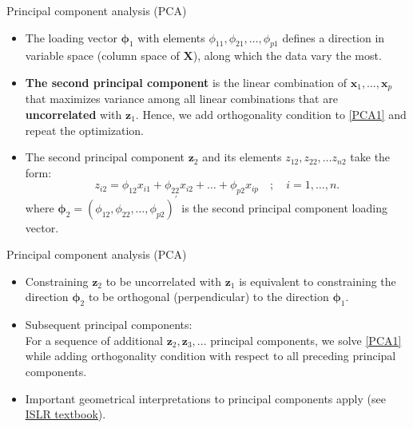 \documentclass{beamer}
\begin{document}
\begin{frame}{Principal component analysis (PCA)}
\begin{itemize}
\item The loading vector $\bm{\phi}_1$ with elements $\phi_{11}, \phi_{21},\dots, \phi_{p1}$ defines a direction in variable space (column space of $\bm{X}$), along which the data vary the most.
\medskip
\item \textbf{The second principal component} is the linear combination
of $\bm{x}_1, \dots , \bm{x}_p$ that maximizes variance among all linear combinations that are \textbf{uncorrelated} with $\bm{z}_1$. Hence, we add orthogonality condition to \eqref{PCA1} and repeat the optimization.
\medskip
\item The second principal component $\bm{z}_2$ and its elements $z_{12}, z_{22}, \dots z_{n2}$ take the form:
$$z_{i2}= \phi_{12}x_{i1} + \phi_{22}x_{i2} + \dots + \phi_{p2}x_{ip} \,\,\,\,\,\,;\,\,\,\,\,\,            i=1,\dots,n.$$
where $\bm{\phi}_2 = (\phi_{12}, \phi_{22},\dots, \phi_{p2})^\prime$ is the second principal component loading vector.
\end{itemize}
\end{frame}
\begin{frame}{Principal component analysis (PCA)}
\begin{itemize}
\item Constraining $\bm{z}_2$ to be uncorrelated with $\bm{z}_1$ is equivalent to constraining the direction $\bm{\phi}_2$ to be orthogonal (perpendicular) to the direction $\bm{\phi}_1$. 
\medskip
\item Subsequent principal components: \\ \medskip For a sequence of additional $\bm{z}_2, \bm{z}_3,\dots$ principal components, we solve \eqref{PCA1} while adding orthogonality condition with respect to all preceding principal components.
\medskip
\item Important geometrical interpretations to principal components apply (see \textcolor{blue}{\underline{\href{http://www-bcf.usc.edu/~gareth/ISL/}{ISLR textbook}}}).
\end{itemize}
\end{frame}
\end{document}
